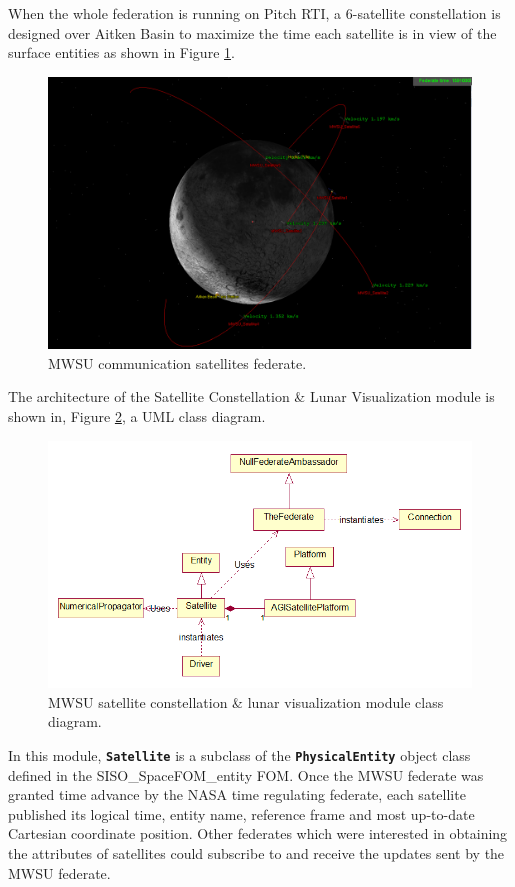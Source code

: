 \documentclass[conference]{IEEEtran}
\newcommand\uml[1]{\texttt{\textbf{#1}}}
\begin{document}
When the whole federation is running on Pitch RTI, a 6-satellite constellation is designed over Aitken Basin to maximize the time each satellite is in view of the surface entities as shown in Figure \ref{Satellites}.
\begin{figure}[!htbp]
	\centering
		\includegraphics[width=\linewidth]{Satellites.PNG}
		\caption{MWSU communication satellites federate.}
	\label{Satellites}
\end{figure}

The architecture of the Satellite Constellation \& Lunar Visualization module is shown in, Figure \ref {Class}, a UML class diagram.
\begin{figure}[!htbp]
	\centering
		\includegraphics[width=\linewidth]{ClassDiagram.png}
		\caption{MWSU satellite constellation \& lunar visualization module class diagram.}
	\label{Class}
\end{figure}
 
In this module, \uml{Satellite} is a subclass of the \uml{PhysicalEntity} object class defined in the SISO\_SpaceFOM\_entity FOM.  Once the MWSU federate was granted time advance by the NASA time regulating federate, each satellite published its logical time, entity name, reference frame and most up-to-date Cartesian coordinate position. Other federates which were interested in obtaining the attributes of satellites could subscribe to and receive the updates sent by the MWSU federate.
\end{document}

